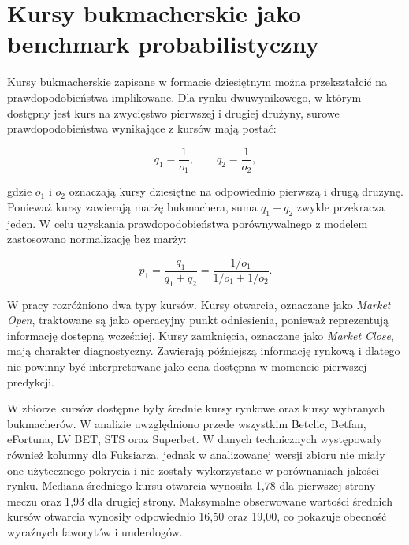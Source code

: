 \section{Kursy bukmacherskie jako benchmark probabilistyczny}

Kursy bukmacherskie zapisane w formacie dziesiętnym można przekształcić na prawdopodobieństwa
implikowane. Dla rynku dwuwynikowego, w którym dostępny jest kurs na zwycięstwo pierwszej i drugiej
drużyny, surowe prawdopodobieństwa wynikające z kursów mają postać:

\begin{equation}
    q_1 = \frac{1}{o_1}, \qquad q_2 = \frac{1}{o_2},
\end{equation}

gdzie \(o_1\) i \(o_2\) oznaczają kursy dziesiętne na odpowiednio pierwszą i drugą drużynę. Ponieważ
kursy zawierają marżę bukmachera, suma \(q_1 + q_2\) zwykle przekracza jeden. W celu uzyskania
prawdopodobieństwa porównywalnego z modelem zastosowano normalizację bez marży:

\begin{equation}
    p_1 = \frac{q_1}{q_1 + q_2}
    = \frac{1/o_1}{1/o_1 + 1/o_2}.
\end{equation}

W pracy rozróżniono dwa typy kursów. Kursy otwarcia, oznaczane jako \textit{Market Open}, traktowane
są jako operacyjny punkt odniesienia, ponieważ reprezentują informację dostępną wcześniej. Kursy
zamknięcia, oznaczane jako \textit{Market Close}, mają charakter diagnostyczny. Zawierają późniejszą
informację rynkową i dlatego nie powinny być interpretowane jako cena dostępna w momencie pierwszej
predykcji.

W zbiorze kursów dostępne były średnie kursy rynkowe oraz kursy wybranych bukmacherów. W analizie
uwzględniono przede wszystkim Betclic, Betfan, eFortuna, LV BET, STS oraz Superbet. W danych
technicznych występowały również kolumny dla Fuksiarza, jednak w analizowanej wersji zbioru nie
miały one użytecznego pokrycia i nie zostały wykorzystane w porównaniach jakości rynku. Mediana
średniego kursu otwarcia wynosiła 1{,}78 dla pierwszej strony meczu oraz 1{,}93 dla drugiej strony.
Maksymalne obserwowane wartości średnich kursów otwarcia wynosiły odpowiednio 16{,}50 oraz 19{,}00,
co pokazuje obecność wyraźnych faworytów i underdogów.

